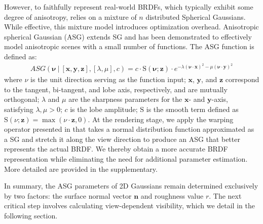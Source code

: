 However, to faithfully represent real-world BRDFs, which typically exhibit some degree of anisotropy, \cite{wang2009all} relies on a mixture of $n$ distributed Spherical Gaussians. While effective, this mixture model introduces optimization overhead. Anisotropic spherical Gaussian (ASG) \cite{xu2013anisotropic} extends SG and has been demonstrated to effectively model anisotropic scenes with a small number of functions. The ASG function is defined as:
\begin{equation}
\label{equ: asg-function}
\begin{aligned}
    ASG(\mathbf{\nu} \: | \: [\mathbf{x}, \mathbf{y}, \mathbf{z}],[\lambda, \mu], c)= c \cdot \mathrm{S}(\mathbf{\nu} ; \mathbf{z}) \cdot e^{-\lambda(\mathbf{\nu} \cdot \mathbf{x})^{2}-\mu(\mathbf{\nu} \cdot \mathbf{y})^{2}}
\end{aligned}
\end{equation}
where $\nu$ is the unit direction serving as the function input; $\mathbf{x}$, $\mathbf{y}$, and $\mathbf{z}$ correspond to the tangent, bi-tangent, and lobe axis, respectively, and are mutually orthogonal; $\lambda$ and $\mu$ are the sharpness parameters for the $\mathbf{x}$- and $\mathbf{y}$-axis, satisfying $\lambda, \mu>0$; $c$ is the lobe amplitude; $\mathrm{S}$ is the smooth term defined as $\mathrm{S}(\nu ; \mathbf{z}) = \max (\nu \cdot \mathbf{z}, 0)$. 
At the rendering stage, we apply the warping operator presented in \cite{xu2013anisotropic} that takes a normal distribution function approximated as a SG and stretch it along the view direction to produce an ASG that better represents the actual BRDF. We thereby obtain a more accurate BRDF representation while eliminating the need for additional parameter estimation. More detailed are provided in the supplementary. 

In summary, the ASG parameters of 2D Gaussians remain determined exclusively by two factors: the surface normal vector $\boldsymbol{n}$ and roughness value $r$. The next critical step involves calculating view-dependent visibility, which we detail in the following section.




